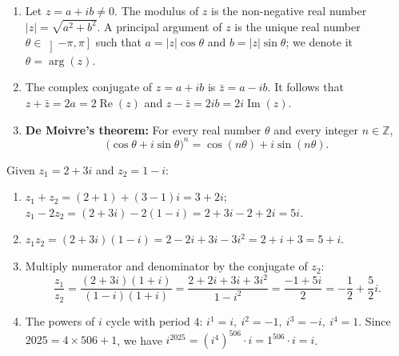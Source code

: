 \documentclass[11pt]{article}
\newcommand{\cle}[1]{{\popxbold\color{popdark}#1}}
\begin{document}
\begin{corrige}
\begin{enumerate}
\item Let $z = a + ib \neq 0$. The \cle{modulus} of $z$ is the non-negative real number $|z| = \sqrt{a^2 + b^2}$. A \cle{principal argument} of $z$ is the unique real number $\theta \in \left]-\pi, \pi\right]$ such that $a = |z|\cos\theta$ and $b = |z|\sin\theta$; we denote it $\theta = \arg(z)$.
\item The \cle{complex conjugate} of $z = a + ib$ is $\bar z = a - ib$. It follows that $z + \bar z = 2a = 2\operatorname{Re}(z)$ and $z - \bar z = 2ib = 2i\operatorname{Im}(z)$.
\item \textbf{De Moivre's theorem:} For every real number $\theta$ and every integer $n \in \mathbb{Z}$,
\[ \bigl(\cos\theta + i\sin\theta\bigr)^n = \cos(n\theta) + i\sin(n\theta). \]
\end{enumerate}
\end{corrige}

\begin{corrige}
Given $z_1 = 2 + 3i$ and $z_2 = 1 - i$:
\begin{enumerate}
\item $z_1 + z_2 = (2+1) + (3-1)i = 3 + 2i$; \quad $z_1 - 2z_2 = (2+3i) - 2(1-i) = 2+3i -2 + 2i = 5i$.
\item $z_1 z_2 = (2+3i)(1-i) = 2 - 2i + 3i - 3i^2 = 2 + i + 3 = 5 + i$.
\item Multiply numerator and denominator by the conjugate of $z_2$:
\[ \frac{z_1}{z_2} = \frac{(2+3i)(1+i)}{(1-i)(1+i)} = \frac{2 + 2i + 3i + 3i^2}{1 - i^2} = \frac{-1 + 5i}{2} = -\frac{1}{2} + \frac{5}{2}i. \]
\item The powers of $i$ cycle with period $4$: $i^1 = i,\ i^2 = -1,\ i^3 = -i,\ i^4 = 1$. Since $2025 = 4 \times 506 + 1$, we have $i^{2025} = (i^4)^{506} \cdot i = 1^{506} \cdot i = i$.
\end{enumerate}
\end{corrige}
\end{document}
